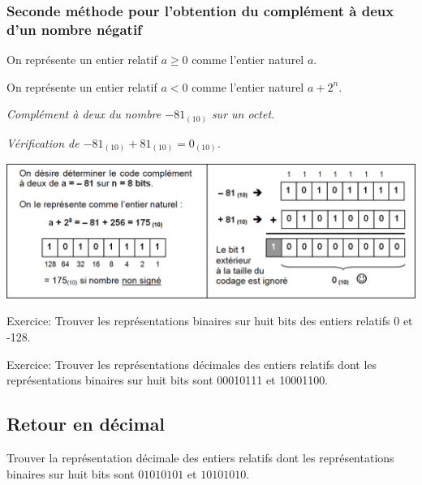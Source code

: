 \documentclass[10pt,fleqn]{article} %
\begin{document}
\subsubsection{Seconde méthode pour l’obtention du complément à deux d’un nombre négatif}

\begin{methode}
On représente un entier relatif $a \geq 0$ comme l’entier naturel $a$.

On représente un entier relatif $a < 0$ comme l’entier naturel $a + 2^n$.

\end{methode}

\begin{exemple}
\textit{Complément à deux du nombre $-81_{(10)}$ sur un octet.}

\textit{Vérification de $-81_{(10)} + 81_{(10)} = 0_{(10)}$.}

\begin{center}
\includegraphics[width=.7\textwidth]{images/complement_2_2}
\end{center}

\end{exemple}


\begin{exercice}
Exercice: Trouver les représentations binaires sur huit bits des entiers relatifs 0 et -128.
\end{exercice}

\begin{exercice}
Exercice: Trouver les représentations décimales des entiers relatifs dont les représentations
binaires sur huit bits sont 00010111 et 10001100.
\end{exercice}
\subsection{Retour en décimal}

\begin{exemple}
Trouver la représentation décimale des entiers relatifs dont les représentations binaires sur huit bits sont $01010101$ et $10101010$.

\vspace{4cm}
\end{exemple}
\end{document}
